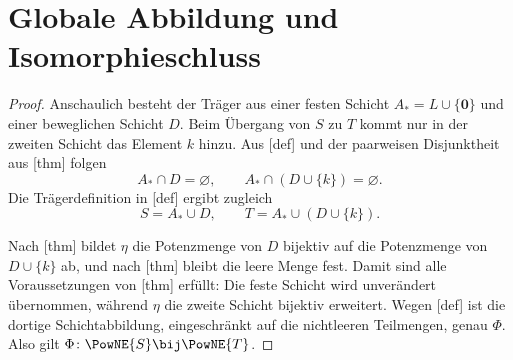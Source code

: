 \documentclass[main.tex]{subfiles}
\begin{document}
\section{Globale Abbildung und Isomorphieschluss}

\begin{proof}
Anschaulich besteht der Träger aus einer festen Schicht
\(A_*=L\cup\{\mathbf0\}\) und einer beweglichen Schicht \(D\). Beim
Übergang von \(S\) zu \(T\) kommt nur in der zweiten Schicht das Element
\(k\) hinzu. Aus [def] und der
paarweisen Disjunktheit aus
[thm] folgen
\[
  A_*\cap D=\varnothing,
  \qquad
  A_*\cap(D\cup\{k\})=\varnothing.
\]
Die Trägerdefinition in [def] ergibt
zugleich
\[
  S=A_*\cup D,
  \qquad
  T=A_*\cup(D\cup\{k\}).
\]

Nach [thm] bildet
\(\eta\) die Potenzmenge von \(D\) bijektiv auf die Potenzmenge von
\(D\cup\{k\}\) ab, und nach
[thm] bleibt die leere
Menge fest. Damit sind alle Voraussetzungen von
[thm] erfüllt: Die feste
Schicht wird unverändert übernommen, während \(\eta\) die zweite Schicht
bijektiv erweitert. Wegen [def] ist die
dortige Schichtabbildung, eingeschränkt auf die nichtleeren Teilmengen,
genau \(\Phi\). Also gilt \(\Phi\colon\PowNE{S}\bij\PowNE{T}\).
\end{proof}

\MogTableProofHeading
\begin{tabproofwide}
\end{tabproofwide}
\end{document}
